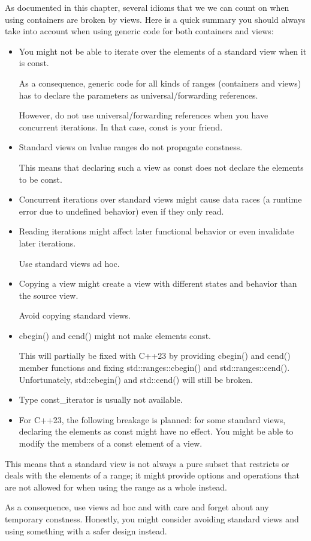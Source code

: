 As documented in this chapter, several idioms that we we can count on when using containers are broken by views. Here is a quick summary you should always take into account when using generic code for both containers and views:

\begin{itemize}
\item
You might not be able to iterate over the elements of a standard view when it is const.

As a consequence, generic code for all kinds of ranges (containers and views) has to declare the parameters as universal/forwarding references.

However, do not use universal/forwarding references when you have concurrent iterations. In that case, const is your friend.

\item
Standard views on lvalue ranges do not propagate constness.

This means that declaring such a view as const does not declare the elements to be const.

\item
Concurrent iterations over standard views might cause data races (a runtime error due to undefined behavior) even if they only read.

\item
Reading iterations might affect later functional behavior or even invalidate later iterations.

Use standard views ad hoc.

\item
Copying a view might create a view with different states and behavior than the source view.

Avoid copying standard views.

\item
cbegin() and cend() might not make elements const.

This will partially be fixed with C++23 by providing cbegin() and cend() member functions and fixing std::ranges::cbegin() and std::ranges::cend(). Unfortunately, std::cbegin() and std::cend() will still be broken.

\item
Type const\_iterator is usually not available.

\item
For C++23, the following breakage is planned: for some standard views, declaring the elements as const might have no effect. You might be able to modify the members of a const element of a view.
\end{itemize}

This means that a standard view is not always a pure subset that restricts or deals with the elements of a range; it might provide options and operations that are not allowed for when using the range as a whole instead.

As a consequence, use views ad hoc and with care and forget about any temporary constness. Honestly, you might consider avoiding standard views and using something with a safer design instead.